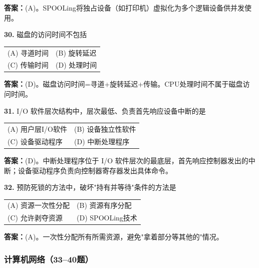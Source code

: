 \ifshowsolutions\par\noindent\textbf{答案：}(A)。SPOOLing将独占设备（如打印机）虚拟化为多个逻辑设备供并发使用。\else \answerarea \fi

\vspace{6pt}

\noindent\textbf{30.} 磁盘的访问时间不包括
\begin{center}
\begin{tabular}{ll}
(A) 寻道时间 & (B) 旋转延迟 \\[6pt]
(C) 传输时间 & (D) 处理时间
\end{tabular}
\end{center}

\ifshowsolutions\par\noindent\textbf{答案：}(D)。磁盘访问时间=寻道+旋转延迟+传输。CPU处理时间不属于磁盘访问时间。\else \answerarea \fi

\vspace{6pt}

\noindent\textbf{31.} I/O 软件层次结构中，层次最低、负责首先响应设备中断的是
\begin{center}
\begin{tabular}{ll}
(A) 用户层I/O软件 & (B) 设备独立性软件 \\[6pt]
(C) 设备驱动程序 & (D) 中断处理程序
\end{tabular}
\end{center}

\ifshowsolutions\par\noindent\textbf{答案：}(D)。中断处理程序位于 I/O 软件层次的最底层，首先响应控制器发出的中断；设备驱动程序负责向控制器寄存器发出具体命令。\else \answerarea \fi

\vspace{6pt}

\noindent\textbf{32.} 预防死锁的方法中，破坏"持有并等待"条件的方法是
\begin{center}
\begin{tabular}{ll}
(A) 资源一次性分配 & (B) 资源有序分配 \\[6pt]
(C) 允许剥夺资源 & (D) SPOOLing技术
\end{tabular}
\end{center}

\ifshowsolutions\par\noindent\textbf{答案：}(A)。一次性分配所有所需资源，避免"拿着部分等其他的"情况。\else \answerarea \fi

\subsubsection*{计算机网络（33--40题）}

